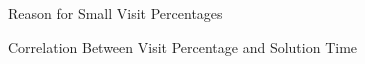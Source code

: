 \begin{figure}[tb]
\centering
{}
\caption{Reason for Small Visit Percentages}
\label{fig:SMPdesign:Reason for Small Visit Percentages}
\end{figure}

\begin{figure}[tb]
\centering
{}
\caption{Correlation Between Visit Percentage and Solution Time}
\label{fig:SMPdesign:Correlation Between Visit Percentage and Solution Time}
\end{figure}

